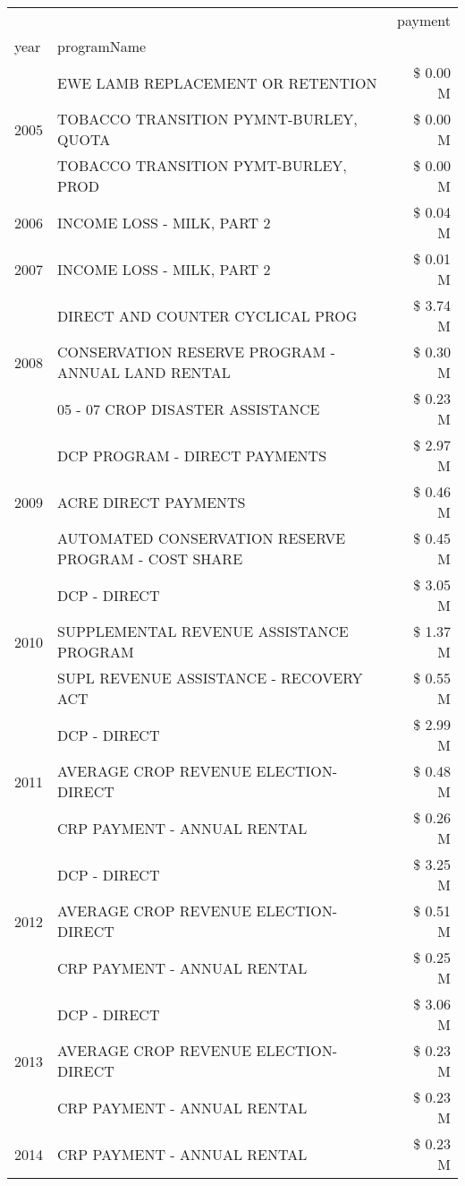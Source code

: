 \begin{tabular}{llr}
\toprule
 &  & payment \\
year & programName &  \\
\midrule
\multirow[t]{3}{*}{2005} & EWE LAMB REPLACEMENT OR RETENTION & \$ 0.00 M \\
 & TOBACCO TRANSITION PYMNT-BURLEY, QUOTA & \$ 0.00 M \\
 & TOBACCO TRANSITION PYMT-BURLEY, PROD & \$ 0.00 M \\
\cline{1-3}
2006 & INCOME LOSS - MILK, PART 2 & \$ 0.04 M \\
\cline{1-3}
2007 & INCOME LOSS - MILK, PART 2 & \$ 0.01 M \\
\cline{1-3}
\multirow[t]{3}{*}{2008} & DIRECT AND COUNTER CYCLICAL PROG & \$ 3.74 M \\
 & CONSERVATION RESERVE PROGRAM - ANNUAL LAND RENTAL & \$ 0.30 M \\
 & 05 - 07 CROP DISASTER ASSISTANCE & \$ 0.23 M \\
\cline{1-3}
\multirow[t]{3}{*}{2009} & DCP PROGRAM - DIRECT PAYMENTS & \$ 2.97 M \\
 & ACRE DIRECT PAYMENTS & \$ 0.46 M \\
 & AUTOMATED CONSERVATION RESERVE PROGRAM - COST SHARE & \$ 0.45 M \\
\cline{1-3}
\multirow[t]{3}{*}{2010} & DCP - DIRECT & \$ 3.05 M \\
 & SUPPLEMENTAL REVENUE ASSISTANCE PROGRAM & \$ 1.37 M \\
 & SUPL REVENUE ASSISTANCE - RECOVERY ACT & \$ 0.55 M \\
\cline{1-3}
\multirow[t]{3}{*}{2011} & DCP - DIRECT & \$ 2.99 M \\
 & AVERAGE CROP REVENUE ELECTION-DIRECT & \$ 0.48 M \\
 & CRP PAYMENT - ANNUAL RENTAL & \$ 0.26 M \\
\cline{1-3}
\multirow[t]{3}{*}{2012} & DCP - DIRECT & \$ 3.25 M \\
 & AVERAGE CROP REVENUE ELECTION-DIRECT & \$ 0.51 M \\
 & CRP PAYMENT - ANNUAL RENTAL & \$ 0.25 M \\
\cline{1-3}
\multirow[t]{3}{*}{2013} & DCP - DIRECT & \$ 3.06 M \\
 & AVERAGE CROP REVENUE ELECTION-DIRECT & \$ 0.23 M \\
 & CRP PAYMENT - ANNUAL RENTAL & \$ 0.23 M \\
\cline{1-3}
\multirow[t]{3}{*}{2014} & CRP PAYMENT - ANNUAL RENTAL & \$ 0.23 M \\

\end{tabular}
